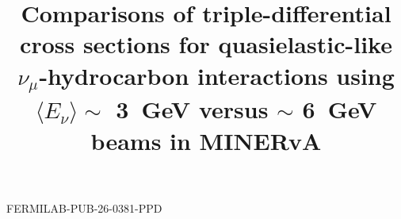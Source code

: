 \documentclass[aps,prl,twocolumn,showpacs,superscriptaddress, floatfix,10pt]{revtex4-2}
\begin{document}

\hspace{5.2in} \mbox{FERMILAB-PUB-26-0381-PPD}


\title{Comparisons of triple-differential cross sections for quasielastic-like $\nu_\mu$-hydrocarbon interactions using $\langle E_\nu\rangle \sim$ 3~GeV versus $\sim$ 6~GeV beams in MINERvA}

\newcommand{\Rutgers}{Rutgers, The State University of New Jersey, Piscataway, New Jersey 08854, USA}
\newcommand{\Hampton}{Hampton University, Dept. of Physics, Hampton, VA 23668, USA}
\newcommand{\Dortmund}{Institute of Physics, Dortmund University, 44221, Germany }
\newcommand{\Otterbein}{Department of Physics, Otterbein University, 1 South Grove Street, Westerville, OH, 43081 USA}
\newcommand{\JMU}{James Madison University, Harrisonburg, Virginia 22807, USA}
\newcommand{\Florida}{University of Florida, Department of Physics, Gainesville, FL 32611}
\newcommand{\UCIrvine}{Department of Physics and Astronomy, University of California, Irvine, Irvine, California 92697-4575, USA}
\newcommand{\CBPF}{Centro Brasileiro de Pesquisas F\'{i}sicas, Rua Dr. Xavier Sigaud 150, Urca, Rio de Janeiro, Rio de Janeiro, 22290-180, Brazil}
\newcommand{\PUCP}{Secci\'{o}n F\'{i}sica, Departamento de Ciencias, Pontificia Universidad Cat\'{o}lica del Per\'{u}, Apartado 1761, Lima, Per\'{u}}
\newcommand{\INRM}{Institute for Nuclear Research of the Russian Academy of Sciences, 117312 Moscow, Russia}
\newcommand{\Jlab}{Jefferson Lab, 12000 Jefferson Avenue, Newport News, VA 23606, USA}
\newcommand{\Pittsburgh}{Department of Physics and Astronomy, University of Pittsburgh, Pittsburgh, Pennsylvania 15260, USA}
\newcommand{\Guanajuato}{Campus Le\'{o}n y Campus Guanajuato, Universidad de Guanajuato, Lascurain de Retana No. 5, Colonia Centro, Guanajuato 36000, Guanajuato M\'{e}xico.}
\newcommand{\Athens}{Department of Physics, University of Athens, GR-15771 Athens, Greece}
\newcommand{\Tufts}{Physics Department, Tufts University, Medford, Massachusetts 02155, USA}
\newcommand{\WM}{Department of Physics, William \& Mary, Williamsburg, Virginia 23187, USA}
\newcommand{\FNAL}{Fermi National Accelerator Laboratory, Batavia, Illinois 60510, USA}
\newcommand{\Purdue}{Department of Chemistry and Physics, Purdue University Calumet, Hammond, Indiana 46323, USA}
\newcommand{\MCLA}{Massachusetts College of Liberal Arts, 375 Church Street, North Adams, MA 01247}
\end{document}
